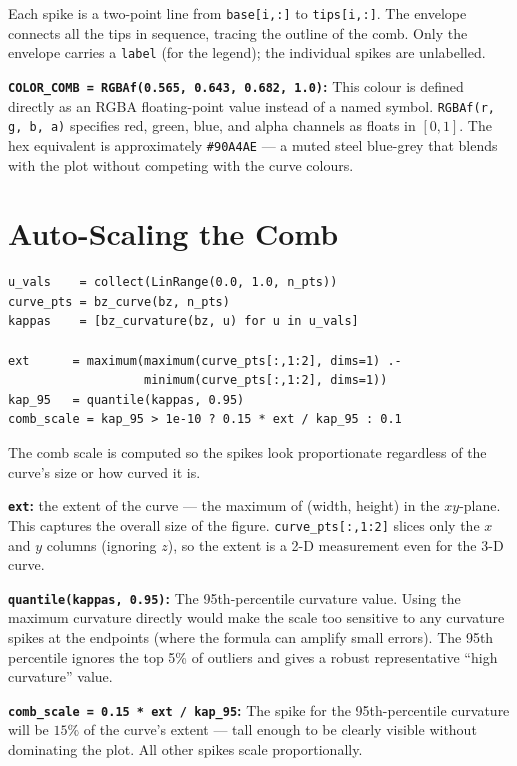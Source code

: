 \documentclass[12pt, a4paper]{article}
\newcommand{\cd}[1]{\texttt{#1}}
\begin{document}
Each spike is a two-point line from \cd{base[i,:]} to
\cd{tips[i,:]}.
The envelope connects all the tips in sequence,
tracing the outline of the comb.
Only the envelope carries a \cd{label} (for the legend);
the individual spikes are unlabelled.

\textbf{\cd{COLOR\_COMB = RGBAf(0.565, 0.643, 0.682, 1.0)}:}
This colour is defined directly as an RGBA floating-point
value instead of a named symbol.
\cd{RGBAf(r, g, b, a)} specifies red, green, blue, and
alpha channels as floats in $[0, 1]$.
The hex equivalent is approximately \cd{\#90A4AE} ---
a muted steel blue-grey that blends with the plot
without competing with the curve colours.


\section{Auto-Scaling the Comb}

\begin{verbatim}
u_vals    = collect(LinRange(0.0, 1.0, n_pts))
curve_pts = bz_curve(bz, n_pts)
kappas    = [bz_curvature(bz, u) for u in u_vals]

ext      = maximum(maximum(curve_pts[:,1:2], dims=1) .-
                   minimum(curve_pts[:,1:2], dims=1))
kap_95   = quantile(kappas, 0.95)
comb_scale = kap_95 > 1e-10 ? 0.15 * ext / kap_95 : 0.1
\end{verbatim}

The comb scale is computed so the spikes look
proportionate regardless of the curve's size or
how curved it is.

\textbf{\cd{ext}:} the extent of the curve --- the
maximum of (width, height) in the $xy$-plane.
This captures the overall size of the figure.
\cd{curve\_pts[:,1:2]} slices only the $x$ and $y$ columns
(ignoring $z$), so the extent is a 2-D measurement
even for the 3-D curve.

\textbf{\cd{quantile(kappas, 0.95)}:}
The 95th-percentile curvature value.
Using the maximum curvature directly would make the
scale too sensitive to any curvature spikes at the
endpoints (where the formula can amplify small errors).
The 95th percentile ignores the top 5\% of outliers
and gives a robust representative ``high curvature''
value.

\textbf{\cd{comb\_scale = 0.15 * ext / kap\_95}:}
The spike for the 95th-percentile curvature will be
$15\%$ of the curve's extent --- tall enough to be
clearly visible without dominating the plot.
All other spikes scale proportionally.
\end{document}
